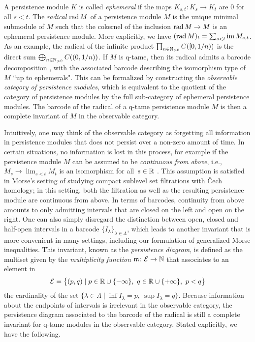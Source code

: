 A persistence module $K$ is called \emph{ephemeral} if the maps $K_{s,t} \colon K_s \to K_t$ are $0$ for all $s < t$.
The \emph{radical} $\operatorname{rad} M$ of a persistence module $M$ is the unique minimal submodule of $M$ such that the cokernel of the inclusion $\operatorname{rad} M \to M$ is an ephemeral persistence module.
More explicitly, we have $(\operatorname{rad} M)_t = \sum_{s<t}\operatorname{im} M_{s,t}$.
As an example, the radical of the infinite product $\prod_{n \in \mathbb{N}_{> 0}} C([0,1/n))$ is the direct sum $\bigoplus_{n \in \mathbb{N}_{> 0}} C((0,1/n))$.
If $M$ is q-tame, then its radical admits a barcode decomposition \cite[Corollary~3.6]{Chazal.2016b},
with the associated barcode describing the isomorphism type of~$M$ ``up to ephemerals".
This can be formalized by constructing the \emph{observable category of persistence modules}, which is equivalent to the quotient of the category of persistence modules by the full sub-category of ephemeral persistence modules.
The barcode of the radical of a q-tame persistence module $M$ is then a complete invariant of $M$ in the observable category.

Intuitively, one may think of the observable category as forgetting all information in persistence modules that does not persist over a non-zero amount of time.
In certain situations, no information is lost in this process, for example if the persistence module $M$ can be assumed to be \emph{continuous from above}, i.e., $M_{s} \to \lim_{s < t} M_{t}$ is an isomorphism for all~$s \in \mathbb{R}$ \cite{Schmahl.2021}.
This assumption is satisfied in Morse's setting of studying compact sublevel set filtrations with \v{C}ech homology; in this setting, both the filtration as well as the resulting persistence module are continuous from above.
In terms of barcodes, continuity from above amounts to only admitting intervals that are closed on the left and open on the right.
One can also simply disregard the distinction between open, closed and half-open intervals in a barcode $\{I_{\lambda}\}_{\lambda \in \Lambda}$, which leads to another invariant that is more convenient in many settings, including our formulation of generalized Morse inequalities.
This invariant, known as the \emph{persistence diagram}, is defined as the multiset given by the \emph{multiplicity function} $\mathfrak{m} \colon \mathcal{E} \to \mathbb{N}$ that associates to an element in
\begin{equation*}
\mathcal{E} =
\big\{ (p,q) \mid p \in \mathbb{R} \cup \{-\infty\}, \ q \in \mathbb{R} \cup \{+\infty\}, \ p < q \big\}
\end{equation*}
the cardinality of the set $\{ \lambda \in \Lambda \mid \inf I_{\lambda} = p,\ \sup I_{\lambda} = q\}$.
Because information about the endpoints of intervals is irrelevant in the observable category, the persistence diagram associated to the barcode of the radical is still a complete invariant for q-tame modules in the observable category.
Stated explicitly, we have the following.

